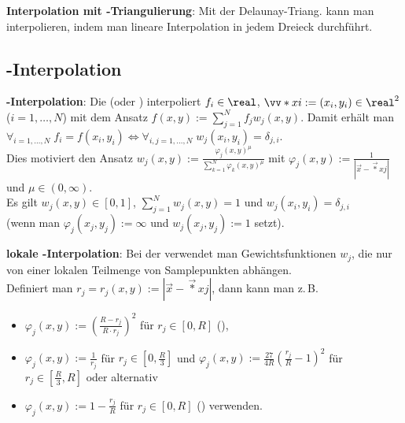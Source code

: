 \textbf{Interpolation mit -Triangulierung}:
Mit der Delaunay-Triang. kann man interpolieren,
indem man lineare Interpolation in jedem Dreieck durchführt.

\subsection{%
    -Interpolation%
}

\textbf{-Interpolation}:
Die  (oder )
interpoliert $f_i \in \real$, $\vec*{x}{i} := (x_i, y_i) \in \real^2$ ($i = 1, \dotsc, N$)
mit dem Ansatz $f(x, y) := \sum_{j=1}^N f_j w_j(x, y)$.
Damit erhält man $\forall_{i=1,\dotsc,N}\; f_i = f(x_i, y_i) \iff
\forall_{i,j=1,\dotsc,N}\; w_j(x_i, y_i) = \delta_{j,i}$.\\
Dies motiviert den Ansatz
$w_j(x, y) := \frac{\varphi_j(x, y)^\mu}{\sum_{k=1}^N \varphi_k(x, y)^\mu}$ mit
$\varphi_j(x, y) := \frac{1}{|\vec{x} - \vec*{x}{j}|}$ und $\mu \in (0, \infty)$.\\
Es gilt $w_j(x, y) \in [0, 1]$, $\sum_{j=1}^N w_j(x, y) = 1$ und $w_j(x_i, y_i) = \delta_{j,i}$\\
(wenn man $\varphi_j(x_j, y_j) := \infty$ und $w_j(x_j, y_j) := 1$ setzt).

\linie

\textbf{lokale -Interpolation}:
Bei der  verwendet man
Gewichtsfunktionen $w_j$, die nur von einer lokalen Teilmenge von Samplepunkten abhängen.\\
Definiert man $r_j = r_j(x, y) := |\vec{x} - \vec*{x}{j}|$, dann
kann man z.\,B.
\begin{itemize}
    \item
    $\varphi_j(x, y) := \left(\frac{R - r_j}{R \cdot r_j}\right)^2$ für $r_j \in [0, R]$
    (),

    \item
    $\varphi_j(x, y) := \frac{1}{r_j}$ für $r_j \in [0, \frac{R}{3}]$ und
    $\varphi_j(x, y) := \frac{27}{4R} \left(\frac{r_j}{R} - 1\right)^2$ für
    $r_j \in [\frac{R}{3}, R]$ oder alternativ

    \item
    $\varphi_j(x, y) := 1 - \frac{r_j}{R}$ für $r_j \in [0, R]$
    () verwenden.
\end{itemize}

